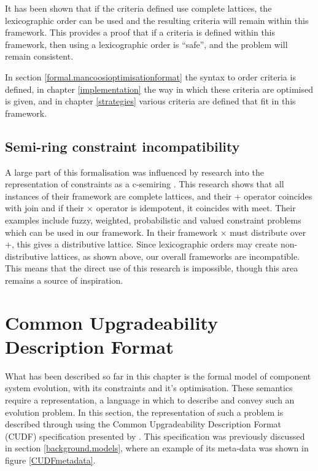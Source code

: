 It has been shown that if the criteria defined use complete lattices, the lexicographic order can be used and the resulting criteria will remain within this framework. 
This provides a proof that if a criteria is defined within this framework, then using a lexicographic order is ``safe'', and the problem will remain consistent.

In section \ref{formal.mancoosioptimisationformat} the syntax to order criteria is defined, 
in chapter \ref{implementation} the way in which these criteria are optimised is given,
and in chapter \ref{strategies} various criteria are defined that fit in this framework.

\subsection{Semi-ring constraint incompatibility}
A large part of this formalisation was influenced by research into the representation of constraints as a c-semiring \citep{Bistarelli1997}.
This research shows that all instances of their framework are complete lattices, and their $+$ operator coincides with join
and if their $\times$ operator is idempotent, it coincides with meet.
Their examples include fuzzy, weighted, probabilistic and valued constraint problems which can be used in our framework.
In their framework $\times$ must distribute over $+$, this gives a distributive lattice.
Since lexicographic orders may create non-distributive lattices, as shown above, our overall frameworks are incompatible.
This means that the direct use of this research is impossible, though this area remains a source of inspiration.

\section{Common Upgradeability Description Format}
\label{formal.cudf}
What has been described so far in this chapter is the formal model of component system evolution, with its constraints and it's optimisation.
These semantics require a representation, a language in which to describe and convey such an evolution problem.
In this section, the representation of such a problem is described through using the Common Upgradeability Description Format (CUDF) specification presented by \citep{treinen2009common}.
This specification was previously discussed in section \ref{background.models}, where an example of its meta-data was shown in figure \ref{CUDFmetadata}.

